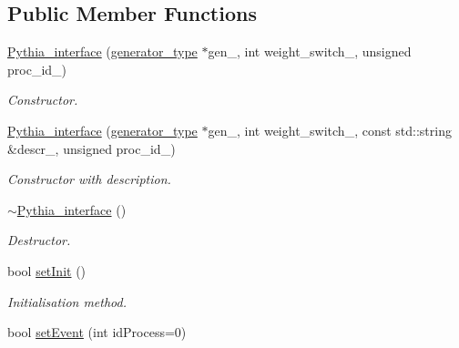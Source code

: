 \subsection*{Public Member Functions}
\begin{DoxyCompactItemize}
\item 
\hypertarget{a00448_aa709b8e8985924f31009362fd72d6058}{\hyperlink{a00448_aa709b8e8985924f31009362fd72d6058}{Pythia\-\_\-interface} (\hyperlink{a00442}{generator\-\_\-type} $\ast$gen\-\_\-, int weight\-\_\-switch\-\_\-, unsigned proc\-\_\-id\-\_)}\label{a00448_aa709b8e8985924f31009362fd72d6058}

\begin{DoxyCompactList}\small\item\em Constructor. \end{DoxyCompactList}\item 
\hypertarget{a00448_a2e93c96da887e8348895c8274b4a903f}{\hyperlink{a00448_a2e93c96da887e8348895c8274b4a903f}{Pythia\-\_\-interface} (\hyperlink{a00442}{generator\-\_\-type} $\ast$gen\-\_\-, int weight\-\_\-switch\-\_\-, const std\-::string \&descr\-\_\-, unsigned proc\-\_\-id\-\_)}\label{a00448_a2e93c96da887e8348895c8274b4a903f}

\begin{DoxyCompactList}\small\item\em Constructor with description. \end{DoxyCompactList}\item 
\hypertarget{a00448_a7359fb2cc840e404123f7f9c0b2b8644}{\hyperlink{a00448_a7359fb2cc840e404123f7f9c0b2b8644}{$\sim$\-Pythia\-\_\-interface} ()}\label{a00448_a7359fb2cc840e404123f7f9c0b2b8644}

\begin{DoxyCompactList}\small\item\em Destructor. \end{DoxyCompactList}\item 
\hypertarget{a00448_a6201668b13598907935b475787093d6b}{bool \hyperlink{a00448_a6201668b13598907935b475787093d6b}{set\-Init} ()}\label{a00448_a6201668b13598907935b475787093d6b}

\begin{DoxyCompactList}\small\item\em Initialisation method. \end{DoxyCompactList}\item 
\hypertarget{a00448_add10b51132c584d44b961cc45e81fa78}{bool \hyperlink{a00448_add10b51132c584d44b961cc45e81fa78}{set\-Event} (int id\-Process=0)}\label{a00448_add10b51132c584d44b961cc45e81fa78}


\end{DoxyCompactItemize}
